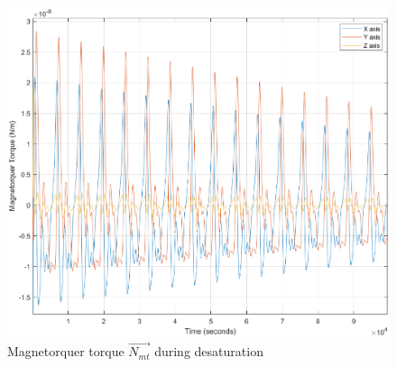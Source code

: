 \begin{figure}[H]
	\centering
	\includegraphics[width=0.8\linewidth]{figures/desat_Nmt}
	\caption{Magnetorquer torque $\vec{N_{mt}}$ during desaturation}
	\label{fig:desatNmt}
\end{figure}